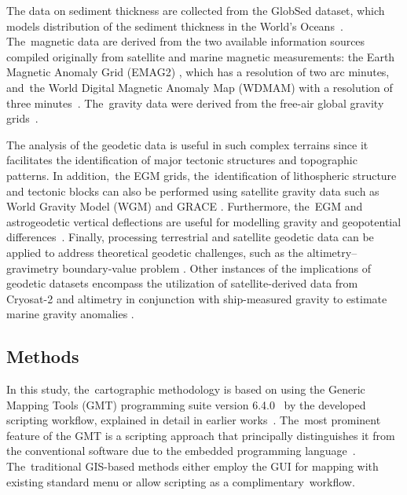 \documentclass[geomatics,article,accept,pdftex,moreauthors]{Definitions/mdpi}
\begin{document}
The data on sediment thickness are collected from the GlobSed dataset, which models distribution of the sediment thickness in the World's Oceans~\cite{Straume}. The~magnetic data are derived from the two available information sources compiled originally from satellite and marine magnetic measurements: the Earth Magnetic Anomaly Grid (EMAG2) \cite{Maus}, which has a resolution of two arc minutes, and~the World Digital Magnetic Anomaly Map (WDMAM) with a resolution of three minutes~\cite{Lesur}. The~gravity data were derived from the free-air global gravity grids~\cite{Sandwell}.

The analysis of the geodetic data is useful in such complex terrains since it facilitates the identification of major tectonic structures and topographic patterns. In addition,~the EGM grids, the~identification of lithospheric structure and tectonic blocks can also be performed using satellite gravity data such as World Gravity Model (WGM) and GRACE \cite{EMISHAW2023104775}. Furthermore, the~EGM and astrogeodetic vertical deflections are useful for modelling gravity and geopotential differences~\cite{WANG2023}. Finally, processing terrestrial and satellite geodetic data can be applied to address theoretical geodetic challenges, such as the altimetry–gravimetry boundary-value problem \cite{Lehmann}. Other instances of the implications of geodetic datasets encompass the utilization of satellite-derived data from Cryosat-2 and altimetry in conjunction with ship-measured gravity to estimate marine gravity anomalies \cite{NGUYEN2020505}. %

\subsection{Methods}

In this study, the~cartographic methodology is based on using the Generic Mapping Tools (GMT) programming suite version 6.4.0~\cite{Wessel} by the developed scripting workflow, explained in detail in earlier works~\cite{Lemenkova202212,Lemenkova202203}. The~most prominent feature of the GMT is a scripting approach that principally distinguishes it from the conventional software due to the embedded programming language~\cite{WesselLuis}. The~traditional GIS-based methods either employ the GUI for mapping with existing standard menu or allow scripting as a complimentary~workflow. 
\end{document}
